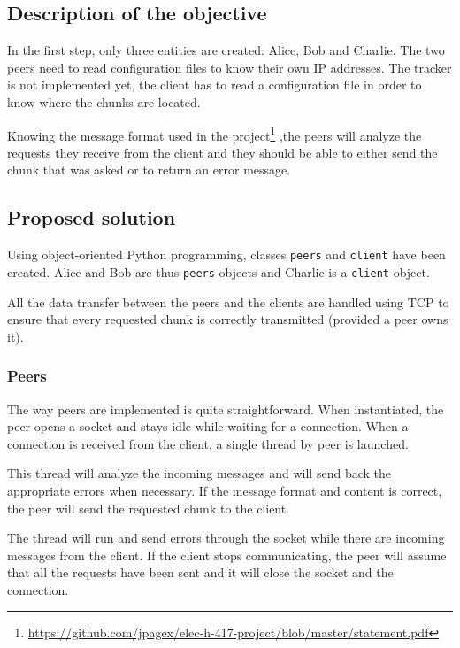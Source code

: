 \subsection{Description of the objective}

In the first step, only three entities are created: Alice, Bob and Charlie. The two peers need to read configuration files to know their own IP addresses. The tracker is not implemented yet, the client has to read a configuration file in order to know where the chunks are located.

Knowing the message format used in the project\footnote{\url{https://github.com/jpagex/elec-h-417-project/blob/master/statement.pdf}}
,the peers will analyze the requests they receive from the client and they should be able to either send the chunk that was asked or to return an error message.

\subsection{Proposed solution}

Using object-oriented Python programming, classes \texttt{peers} and \texttt{client} have been created. Alice and Bob are thus \texttt{peers} objects and Charlie is a \texttt{client} object.

All the data transfer between the peers and the clients are handled using TCP to ensure that every requested chunk is correctly transmitted (provided a peer owns it).

\subsubsection{Peers}

The way peers are implemented is quite straightforward. When instantiated, the peer opens a socket and stays idle while waiting for a connection. When a connection is received from the client, a single thread by peer is launched.

This thread will analyze the incoming messages and will send back the appropriate errors when necessary. If the message format and content is correct, the peer will send the requested chunk to the client.

The thread will run and send errors through the socket while there are incoming messages from the client. If the client stops communicating, the peer will assume that all the requests have been sent and it will close the socket and the connection.

